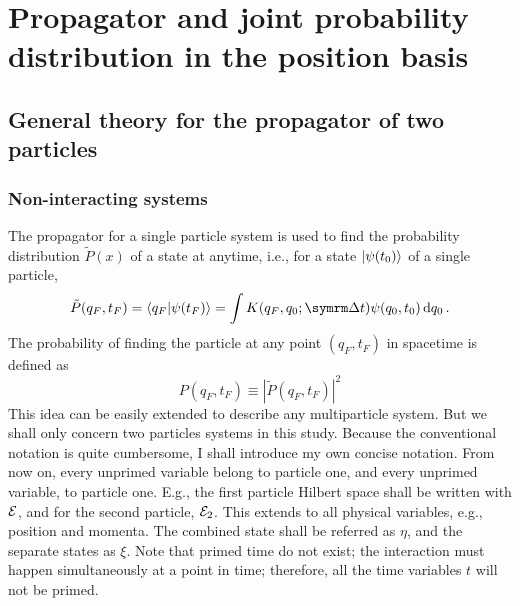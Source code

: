 \chapter{Propagator and joint probability distribution in the position basis}

\section{General theory for the propagator of two particles}

\subsection{Non-interacting systems}

The propagator for a single particle system is used to find the probability distribution $\tilde{P}(x)$ of a state at anytime, i.e., for a state $\ket{\psi(t_0)}$ of a single particle,
\begin{equation}
    \tilde{P}(q_F, t_F) = \braket{q_F}{\psi(t_F)} = \int K(q_F, q_0; \Dd{t})\psi(q_0, t_0)\dd{q_0}.
\end{equation}
The probability of finding the particle at any point $(q_F, t_F)$ in spacetime is defined as
\begin{equation}
    P(q_F, t_F) \equiv |\tilde{P}(q_F, t_F)|^2
\end{equation}
This idea can be easily extended to describe any multiparticle system. But we shall only concern two particles systems in this study. Because the conventional notation is quite cumbersome, I shall introduce my own concise notation. From now on, every unprimed variable belong to particle one, and every unprimed variable, to particle one. E.g., the first particle Hilbert space shall be written with $\mathcal{E}$, and for the second particle, $\mathcal{E}_2$. This extends to all physical variables, e.g., position and momenta. The combined state shall be referred as $\eta$, and the separate states as $\xi$. Note that primed time do not exist; the interaction must happen simultaneously at a point in time; therefore, all the time variables $t$ will not be primed.

